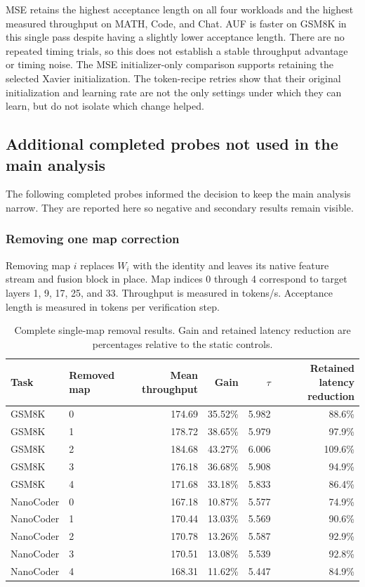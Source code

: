 \FloatBarrier
MSE retains the highest acceptance length on all four workloads and the highest measured throughput on MATH, Code, and Chat. AUF is faster on GSM8K in this single pass despite having a slightly lower acceptance length. There are no repeated timing trials, so this does not establish a stable throughput advantage or timing noise. The MSE initializer-only comparison supports retaining the selected Xavier initialization. The token-recipe retries show that their original initialization and learning rate are not the only settings under which they can learn, but do not isolate which change helped.

\clearpage
\subsection{Additional completed probes not used in the main analysis}
\label{app:additional-probes}

The following completed probes informed the decision to keep the main analysis narrow. They are reported here so negative and secondary results remain visible.

\subsubsection{Removing one map correction}

Removing map $i$ replaces $W_i$ with the identity and leaves its native feature stream and fusion block in place. Map indices 0 through 4 correspond to target layers 1, 9, 17, 25, and 33. Throughput is measured in tokens/s. Acceptance length is measured in tokens per verification step.

\begin{table}[htbp]
\centering
\caption{Complete single-map removal results. Gain and retained latency reduction are percentages relative to the static controls.}
\label{tab:app-map-removal}
\small
\begin{tabular}{llrrrr}
\toprule
Task & Removed map & Mean throughput & Gain & $\tau$ & Retained latency reduction \\
\midrule
GSM8K & 0 & 174.69 & 35.52\% & 5.982 & 88.6\% \\
GSM8K & 1 & 178.72 & 38.65\% & 5.979 & 97.9\% \\
GSM8K & 2 & 184.68 & 43.27\% & 6.006 & 109.6\% \\
GSM8K & 3 & 176.18 & 36.68\% & 5.908 & 94.9\% \\
GSM8K & 4 & 171.68 & 33.18\% & 5.833 & 86.4\% \\
NanoCoder & 0 & 167.18 & 10.87\% & 5.577 & 74.9\% \\
NanoCoder & 1 & 170.44 & 13.03\% & 5.569 & 90.6\% \\
NanoCoder & 2 & 170.78 & 13.26\% & 5.587 & 92.9\% \\
NanoCoder & 3 & 170.51 & 13.08\% & 5.539 & 92.8\% \\
NanoCoder & 4 & 168.31 & 11.62\% & 5.447 & 84.9\% \\
\bottomrule
\end{tabular}
\end{table}

